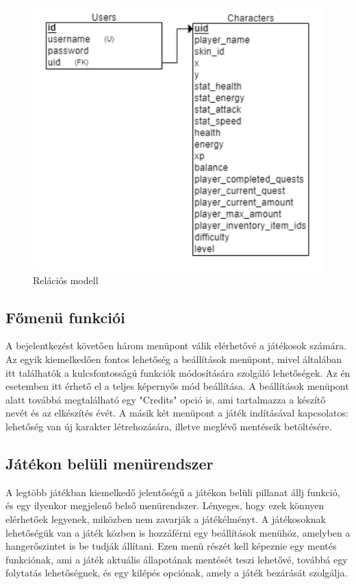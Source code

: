 \begin{figure}[t]
    \centering
    \includegraphics[width=10.0truecm]{images/RelationModell.png}
    \caption{Relációs modell}
    \label{fig:Relációs modell}
\end{figure}

\subsection{Főmenü funkciói}

 A bejelentkezést követően három menüpont válik elérhetővé a játékosok számára. Az egyik kiemelkedően fontos lehetőség a beállítások menüpont, mivel általában itt találhatók a kulcsfontosságú funkciók módosítására szolgáló lehetőségek. Az én esetemben itt érhető el a teljes képernyős mód beállítása. A beállítások menüpont alatt továbbá megtalálható egy "Credits" opció is, ami tartalmazza a készítő nevét és az elkészítés évét. A másik két menüpont a játék indításával kapcsolatos: lehetőség van új karakter létrehozására, illetve meglévő mentéseik betöltésére.

\subsection{Játékon belüli menürendszer}

 A legtöbb játékban kiemelkedő jelentőségű a játékon belüli pillanat állj funkció, és egy ilyenkor megjelenő belső menürendszer. Lényeges, hogy ezek könnyen elérhetőek legyenek, miközben nem zavarják a játékélményt. A játékosoknak lehetőségük van a játék közben is hozzáférni egy beállítások menühöz, amelyben a hangerőszintet is be tudják állítani. Ezen menü részét kell képeznie egy mentés funkciónak, ami a játék aktuális állapotának mentését teszi lehetővé, továbbá egy folytatás lehetőségnek, és egy kilépés opciónak, amely a játék bezárását szolgálja.


